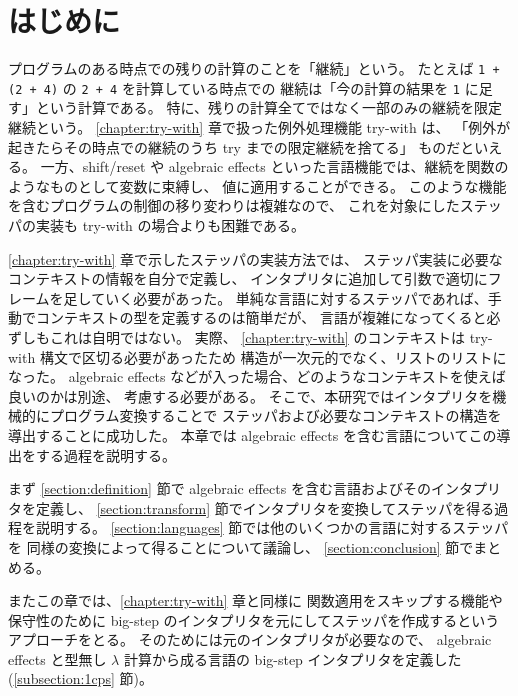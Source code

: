 \section{はじめに}
\label{section:algebraic effects__intro}

プログラムのある時点での残りの計算のことを「継続」という。
たとえば \texttt{1 + (2 + 4)} の \texttt{2 + 4} を計算している時点での
継続は「今の計算の結果を \texttt{1} に足す」という計算である。
特に、残りの計算全てではなく一部のみの継続を限定継続という。
\ref{chapter:try-with} 章で扱った例外処理機能 try-with は、
「例外が起きたらその時点での継続のうち try までの限定継続を捨てる」
ものだといえる。
一方、shift/reset \cite{DF1990} や algebraic effects \cite{PRETNAR201519}
といった言語機能では、継続を関数のようなものとして変数に束縛し、
値に適用することができる。
このような機能を含むプログラムの制御の移り変わりは複雑なので、
これを対象にしたステッパの実装も try-with の場合よりも困難である。

\ref{chapter:try-with} 章で示したステッパの実装方法では、
ステッパ実装に必要なコンテキストの情報を自分で定義し、
インタプリタに追加して引数で適切にフレームを足していく必要があった。
単純な言語に対するステッパであれば、手動でコンテキストの型を定義するのは簡単だが、
言語が複雑になってくると必ずしもこれは自明ではない。
実際、 \ref{chapter:try-with} のコンテキストは try-with 構文で区切る必要があったため
構造が一次元的でなく、リストのリストになった。
algebraic effects などが入った場合、どのようなコンテキストを使えば良いのかは別途、
考慮する必要がある。
そこで、本研究ではインタプリタを機械的にプログラム変換することで
ステッパおよび必要なコンテキストの構造を導出することに成功した。
本章では algebraic effects を含む言語についてこの導出をする過程を説明する。

まず \ref{section:definition} 節で algebraic effects を含む言語およびそのインタプリタを定義し、
\ref{section:transform} 節でインタプリタを変換してステッパを得る過程を説明する。
\ref{section:languages} 節では他のいくつかの言語に対するステッパを
同様の変換によって得ることについて議論し、
\ref{section:conclusion} 節でまとめる。

またこの章では、\ref{chapter:try-with} 章と同様に
関数適用をスキップする機能や保守性のために
big-step のインタプリタを元にしてステッパを作成するというアプローチをとる。
そのためには元のインタプリタが必要なので、
algebraic effects と型無し $\lambda$ 計算から成る言語の
big-step インタプリタを定義した (\ref{subsection:1cps} 節)。
